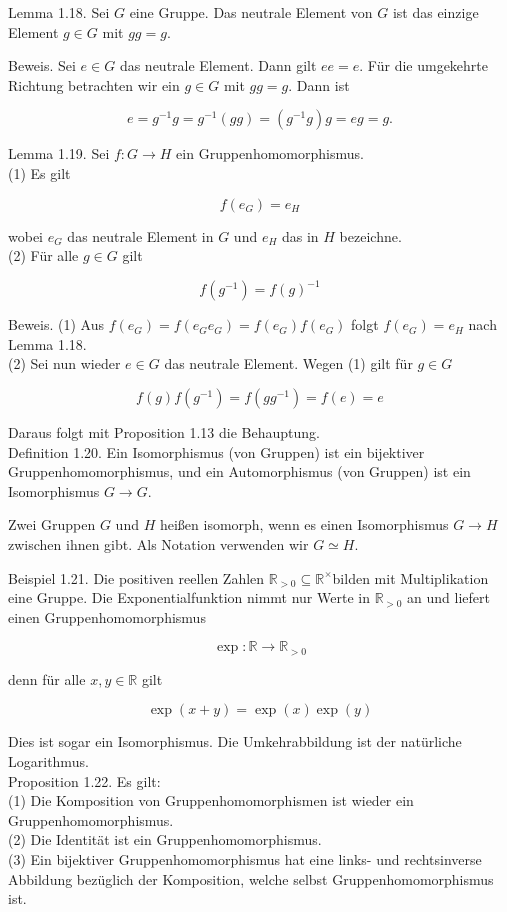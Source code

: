 \documentclass[10pt, letterpaper]{article}
\begin{document}
Lemma 1.18. Sei $G$ eine Gruppe. Das neutrale Element von $G$ ist das einzige Element $g \in G$ mit $g g=g$.

Beweis. Sei $e \in G$ das neutrale Element. Dann gilt $e e=e$. Für die umgekehrte Richtung betrachten wir ein $g \in G$ mit $g g=g$. Dann ist

$$
e=g^{-1} g=g^{-1}(g g)=\left(g^{-1} g\right) g=e g=g .
$$

Lemma 1.19. Sei $f: G \rightarrow H$ ein Gruppenhomomorphismus.\\
(1) Es gilt

$$
f\left(e_{G}\right)=e_{H}
$$

wobei $e_{G}$ das neutrale Element in $G$ und $e_{H}$ das in $H$ bezeichne.\\
(2) Für alle $g \in G$ gilt

$$
f\left(g^{-1}\right)=f(g)^{-1}
$$

Beweis. (1) Aus $f\left(e_{G}\right)=f\left(e_{G} e_{G}\right)=f\left(e_{G}\right) f\left(e_{G}\right)$ folgt $f\left(e_{G}\right)=e_{H}$ nach Lemma 1.18.\\
(2) Sei nun wieder $e \in G$ das neutrale Element. Wegen (1) gilt für $g \in G$

$$
f(g) f\left(g^{-1}\right)=f\left(g g^{-1}\right)=f(e)=e
$$

Daraus folgt mit Proposition 1.13 die Behauptung.\\
Definition 1.20. Ein Isomorphismus (von Gruppen) ist ein bijektiver Gruppenhomomorphismus, und ein Automorphismus (von Gruppen) ist ein Isomorphismus $G \rightarrow G$.

Zwei Gruppen $G$ und $H$ heißen isomorph, wenn es einen Isomorphismus $G \rightarrow H$ zwischen ihnen gibt. Als Notation verwenden wir $G \simeq H$.

Beispiel 1.21. Die positiven reellen Zahlen $\mathbb{R}_{>0} \subseteq \mathbb{R}^{\times}$bilden mit Multiplikation eine Gruppe. Die Exponentialfunktion nimmt nur Werte in $\mathbb{R}_{>0}$ an und liefert einen Gruppenhomomorphismus

$$
\exp : \mathbb{R} \rightarrow \mathbb{R}_{>0}
$$

denn für alle $x, y \in \mathbb{R}$ gilt

$$
\exp (x+y)=\exp (x) \exp (y)
$$

Dies ist sogar ein Isomorphismus. Die Umkehrabbildung ist der natürliche Logarithmus.\\
Proposition 1.22. Es gilt:\\
(1) Die Komposition von Gruppenhomomorphismen ist wieder ein Gruppenhomomorphismus.\\
(2) Die Identität ist ein Gruppenhomomorphismus.\\
(3) Ein bijektiver Gruppenhomomorphismus hat eine links- und rechtsinverse Abbildung bezüglich der Komposition, welche selbst Gruppenhomomorphismus ist.
\end{document}
